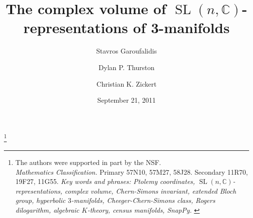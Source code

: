 \documentclass[11pt]{amsart}
\theoremstyle{definition}
\numberwithin{equation}{section}
\DeclareMathOperator{\SL}{SL}
\newcommand{\C}{\mathbb C}
\begin{document}


\title[The complex volume of $\SL(n,\C)$-representations of 3-manifolds]
{The complex volume of $\SL(n,\C)$-representations of 3-manifolds}


\author{Stavros Garoufalidis}
\address{School of Mathematics \\
         Georgia Institute of Technology \\
         Atlanta, GA 30332-0160, USA \newline
         {\tt \url{http://www.math.gatech.edu/~stavros}}}
\author{Dylan P. Thurston}
\address{Department of mathematics \\
        Columbia University \\
         MC 4436 \\
        New York, NY 10027, USA \newline 
        {\tt \url{http://www.math.columbia.edu/~dpt}}}
\author{Christian K. Zickert}
\address{University of Maryland \\
         Department of Mathematics \\
         College Park, MD 20742-4015, USA \newline
         {\tt \url{http://www2.math.umd.edu/~zickert}}}

\thanks{The authors were supported in part by the NSF. \\
 {\em Mathematics Classification.} Primary 57N10, 57M27, 58J28. 
Secondary 11R70, 19F27, 11G55.
\newline
{\em Key words and phrases: Ptolemy coordinates, $\SL(n,\C)$-representations, 
complex volume, Chern-Simons invariant, extended Bloch group, hyperbolic $3$-manifolds, Cheeger-Chern-Simons class,
Rogers dilogarithm, algebraic $K$-theory, census manifolds, SnapPy.
}
}

\date{September 21, 2011} %

\end{document}
